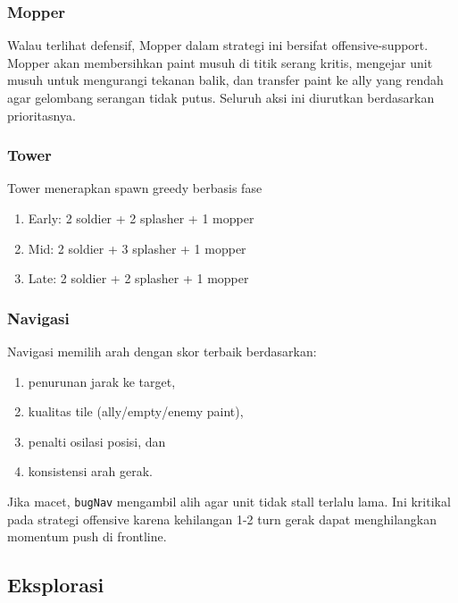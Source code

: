 \subsubsection{Mopper}

Walau terlihat defensif, Mopper dalam strategi ini bersifat offensive-support. Mopper akan membersihkan paint musuh di titik serang kritis, mengejar unit musuh untuk mengurangi tekanan balik, dan transfer paint ke ally yang rendah agar gelombang serangan tidak putus. Seluruh aksi ini diurutkan berdasarkan prioritasnya.

\subsubsection{Tower}

Tower menerapkan spawn greedy berbasis fase
\begin{enumerate}
    \item Early: 2 soldier + 2 splasher + 1 mopper
    \item Mid: 2 soldier + 3 splasher + 1 mopper
    \item Late: 2 soldier + 2 splasher + 1 mopper
\end{enumerate}

\subsubsection{Navigasi}

Navigasi memilih arah dengan skor terbaik berdasarkan:
\begin{enumerate}
    \item penurunan jarak ke target,
    \item kualitas tile (ally/empty/enemy paint),
    \item penalti osilasi posisi, dan
    \item konsistensi arah gerak.
\end{enumerate}

Jika macet, \texttt{bugNav} mengambil alih agar unit tidak stall terlalu lama. Ini kritikal pada strategi offensive karena kehilangan 1-2 turn gerak dapat menghilangkan momentum push di frontline.

\subsection{Eksplorasi}

